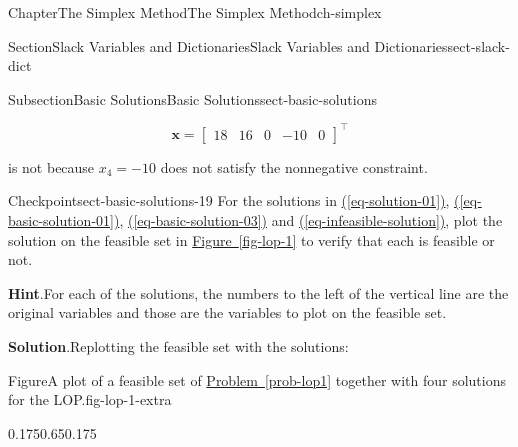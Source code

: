 \documentclass[oneside,10pt,]{book}
\newcommand{\blocktitlefont}{\relax}
\newcommand{\xreffont}{\relax}
\numberwithin{equation}{section}
\newcommand{\amp}{&}
\begin{document}
\begin{chapterptx}{Chapter}{The Simplex Method}{}{The Simplex Method}{}{}{ch-simplex}
\begin{sectionptx}{Section}{Slack Variables and Dictionaries}{}{Slack Variables and Dictionaries}{}{}{sect-slack-dict}
\begin{subsectionptx}{Subsection}{Basic Solutions}{}{Basic Solutions}{}{}{sect-basic-solutions}
\par
%
\begin{equation}
\boldsymbol{x}=\left[\begin{array}{rr|rrr} 18 \amp 16 \amp 0 \amp -10 \amp 0 \end{array}\right]^{\intercal}\label{eq-infeasible-solution}
\end{equation}
%
\par
is not because \(x_4=-10\) does not satisfy the nonnegative constraint.%
\begin{inlineexercise}{Checkpoint}{}{sect-basic-solutions-19}%
For the solutions in \hyperref[eq-solution-01]{({\xreffont\ref{eq-solution-01}})}, \hyperref[eq-basic-solution-01]{({\xreffont\ref{eq-basic-solution-01}})}, \hyperref[eq-basic-solution-03]{({\xreffont\ref{eq-basic-solution-03}})} and \hyperref[eq-infeasible-solution]{({\xreffont\ref{eq-infeasible-solution}})}, plot the solution on the feasible set in \hyperref[fig-lop-1]{Figure~{\xreffont\ref{fig-lop-1}}} to verify that each is feasible or not.%
\par\smallskip%
\noindent\textbf{\blocktitlefont Hint}.\hypertarget{sect-basic-solutions-19-2}{}\quad{}For each of the solutions, the numbers to the left of the vertical line are the original variables and those are the variables to plot on the feasible set.%
\par\smallskip%
\noindent\textbf{\blocktitlefont Solution}.\hypertarget{sect-basic-solutions-19-3}{}\quad{}Replotting the feasible set with the solutions:%
\begin{figureptx}{Figure}{A plot of a feasible set of \hyperref[prob-lop1]{Problem~{\xreffont\ref{prob-lop1}}} together with four solutions for the LOP.}{fig-lop-1-extra}{}%
\begin{image}{0.175}{0.65}{0.175}{}%
\end{image}
\end{figureptx}
\end{inlineexercise}
\end{subsectionptx}
\end{sectionptx}
\end{chapterptx}
\end{document}
